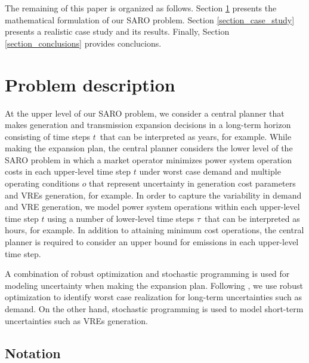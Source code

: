 \documentclass[final]{IEEEtran}
\begin{document}
The remaining of this paper is organized as follows. Section \ref{section_problem_description} presents the mathematical formulation of our SARO problem. Section \ref{section_case_study} presents a realistic case study and its results. Finally, Section \ref{section_conclusions} provides conclucions.

\section{Problem description}
\label{section_problem_description}


At the upper level of our SARO problem, we consider a central planner that makes generation and transmission expansion decisions in a long-term horizon consisting of time steps $t$ that can be interpreted as years, for example. While making the expansion plan, the central planner considers the lower level of the SARO problem in which a market operator minimizes power system operation costs in each upper-level time step $t$ under worst case demand and multiple operating conditions $o$ that represent uncertainty in generation cost parameters and VREs generation, for example. In order to capture the variability in demand and VRE generation, we model power system operations within each upper-level time step $t$ using a number of lower-level time steps $\tau$ that can be interpreted as hours, for example. In addition to attaining minimum cost operations, the central planner is required to consider an upper bound for emissions in each upper-level time step.

A combination of robust optimization and stochastic programming is used for modeling uncertainty when making the expansion plan. Following \cite{Baringo2018}, we use robust optimization to identify worst case realization for long-term uncertainties such as demand. On the other hand, stochastic programming is used to model short-term uncertainties such as VREs generation.

\subsection{Notation}
\end{document}
